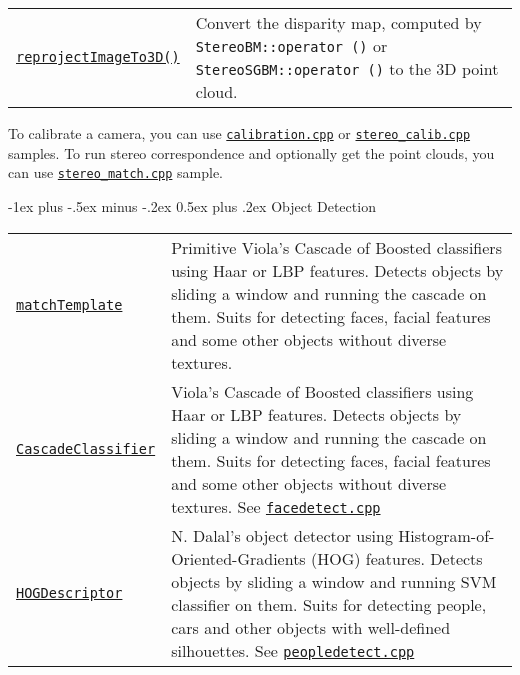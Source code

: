 \documentclass[10pt,landscape]{article}
\makeatletter
\renewcommand{\section}{\@startsection{section}{1}{0mm}%
                                {-1ex plus -.5ex minus -.2ex}%
                                {0.5ex plus .2ex}%
                                {\normalfont\large\bfseries}}
\makeatother
\begin{document}
\begin{multicols}{3}
\begin{tabular}{@{}p{\the\MyLen}%
                @{}p{\linewidth-\the\MyLen}@{}}
\texttt{\href{http://opencv.willowgarage.com/documentation/cpp/camera_calibration_and_3d_reconstruction.html\#cv-reprojectimageto3d}{reprojectImageTo3D()}} & Convert the disparity map, computed by \texttt{StereoBM::operator ()} or \texttt{StereoSGBM::operator ()} to the 3D point cloud.\\

\end{tabular}

To calibrate a camera, you can use \texttt{\href{https://code.ros.org/svn/opencv/trunk/opencv/samples/c/calibration.cpp}{calibration.cpp}} or
\texttt{\href{https://code.ros.org/svn/opencv/trunk/opencv/samples/c/stereo\_calib.cpp}{stereo\_calib.cpp}} samples.
To run stereo correspondence and optionally get the point clouds, you can use
\texttt{\href{https://code.ros.org/svn/opencv/trunk/opencv/samples/c/stereo\_match.cpp}{stereo\_match.cpp}} sample.

\section{Object Detection}

\begin{tabular}{@{}p{\the\MyLen}%
                @{}p{\linewidth-\the\MyLen}@{}}
                \texttt{\href{http://opencv.willowgarage.com/documentation/cpp/object_detection.html\#matchTemplate}{matchTemplate}} & Primitive Viola's Cascade of Boosted classifiers using Haar or LBP features. Detects objects by sliding a window and running the cascade on them. Suits for detecting faces, facial features and some other objects without diverse textures.\\

\texttt{\href{http://opencv.willowgarage.com/documentation/cpp/object_detection.html\#CascadeClassifier}{CascadeClassifier}} & Viola's Cascade of Boosted classifiers using Haar or LBP features. Detects objects by sliding a window and running the cascade on them. Suits for detecting faces, facial features and some other objects without diverse textures. See \texttt{\href{https://code.ros.org/svn/opencv/trunk/opencv/samples/c/facedetect.cpp}{facedetect.cpp}}\\

\texttt{\href{http://opencv.willowgarage.com/documentation/cpp/object_detection.html\#HOGDescriptor}{HOGDescriptor}} & N. Dalal's object detector using Histogram-of-Oriented-Gradients (HOG) features. Detects objects by sliding a window and running SVM classifier on them. Suits for detecting people, cars and other objects with well-defined silhouettes. See \texttt{\href{https://code.ros.org/svn/opencv/trunk/opencv/samples/c/peopledetect.cpp}{peopledetect.cpp}}\\


\end{tabular}
\end{multicols}
\end{document}
